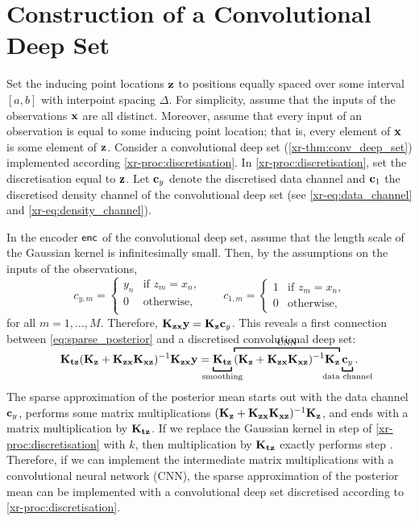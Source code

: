 \documentclass[12pt]{report}
\newcommand{\xrprefix}[1]{xr-#1}
\begin{document}
\section{Construction of a Convolutional Deep Set}

Set the inducing point locations $\mathbf{z}$ to positions equally spaced over some interval $[a, b]$ with interpoint spacing $\Delta$.
For simplicity, assume that the inputs of the observations $\mathbf{x}$ are all distinct.
Moreover, assume that every input of an observation is equal to some inducing point location;
that is, every element of $\mathbf{x}$ is some element of $\mathbf{z}$.
Consider a convolutional deep set (\cref{\xrprefix{thm:conv_deep_set}}) implemented according \cref{\xrprefix{proc:discretisation}}.
In \cref{\xrprefix{proc:discretisation}}, set the discretisation equal to $\mathbf{z}$.
Let $\mathbf{c}_y$ denote the discretised data channel and $\mathbf{c}_1$ the discretised density channel of the convolutional deep set (see \eqref{\xrprefix{eq:data_channel}} and \eqref{\xrprefix{eq:density_channel}}).

In the encoder $\mathsf{enc}$ of the convolutional deep set, assume that the length scale of the Gaussian kernel is infinitesimally small.
Then, by the assumptions on the inputs of the observations,%
\begin{equation}
    c_{y,m}
    = \begin{cases}
        y_n    & \text{if $z_m = x_n$,} \\
        0   & \text{otherwise,} \\
    \end{cases}
    \qquad
    c_{1,m}
    = \begin{cases}
        1    & \text{if $z_m = x_n$,} \\
        0   & \text{otherwise,}
    \end{cases}
\end{equation}
for all $m = 1,\ldots,M$.
Therefore, $\mathbf{K}_{\mathbf{z}\mathbf{x}}\mathbf{y} = \mathbf{K}_{\mathbf{z}} \mathbf{c}_y$.
This reveals a first connection between \eqref{eq:sparse_posterior} and a discretised convolutional deep set:
\begin{equation} \label{eq:connection_1}
    \mK_{\vt \vz} (\mK_{\vz} + \mK_{\vz\vx} \mK_{\vx\vz})^{-1} \mK_{\vz\vx} \vy
    = 
    \underbracket[1pt]{\vphantom{c_y}\mK_{\vt\vz}}_{\mathclap{\text{smoothing}}}
    \smash{\overbracket[1pt]{(\mK_{\vz} + \mK_{\vz\vx} \mK_{\vx\vz})^{-1}
        \mK_{\vz}
    }^{\text{CNN}}}
    \underbracket[1pt]{\vc_y}_{\mathclap{\text{data channel}}}.
\end{equation}
The sparse approximation of the posterior mean starts out with the data channel $\mathbf{c}_y$,
performs some matrix multiplications $(\mathbf{K}_{\mathbf{z}} + \mathbf{K}_{\mathbf{z}\mathbf{x}} \mathbf{K}_{\mathbf{x}\mathbf{z}})^{-1}
    \mathbf{K}_{\mathbf{z}}$, and ends with a matrix multiplication by $\mathbf{K}_{\mathbf{t}\mathbf{z}}$.
If we replace the Gaussian kernel in step  of \cref{\xrprefix{proc:discretisation}} with $k$,
then multiplication by $\mathbf{K}_{\mathbf{t}\mathbf{z}}$ exactly performs step .
Therefore, if we can implement the intermediate matrix multiplications with a convolutional neural network (CNN),
the sparse approximation of the posterior mean can be implemented with a convolutional deep set discretised according to \cref{\xrprefix{proc:discretisation}}.
\end{document}
